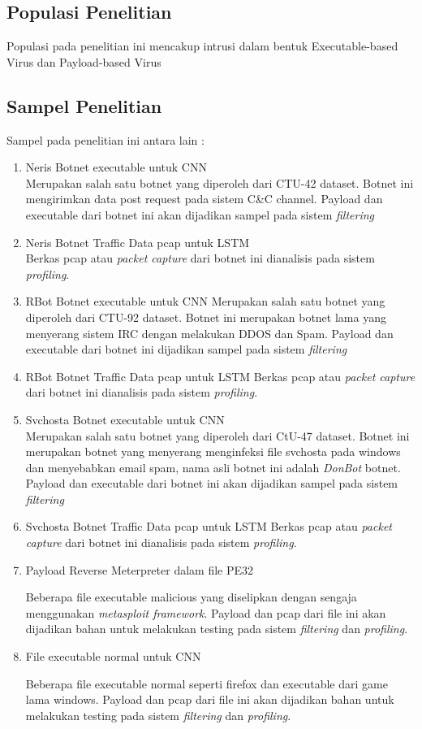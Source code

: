 \documentclass[./skripsi.tex]{subfiles}
\begin{document}
\subsection{Populasi Penelitian}
\par Populasi pada penelitian ini mencakup intrusi dalam bentuk Executable-based Virus dan Payload-based Virus
\subsection{Sampel Penelitian}
\par Sampel pada penelitian ini antara lain :
\begin{enumerate}
    \item Neris Botnet executable untuk CNN\\
    Merupakan salah satu botnet yang diperoleh dari CTU-42 dataset. Botnet ini mengirimkan data post request pada sistem C\&C channel. Payload dan executable dari botnet ini akan dijadikan sampel pada sistem \textit{filtering}
    \item Neris Botnet Traffic Data pcap untuk LSTM\\
    Berkas pcap atau \textit{packet capture} dari botnet ini dianalisis pada sistem \textit{profiling}.
    \item RBot Botnet executable untuk CNN
    Merupakan salah satu botnet yang diperoleh dari CTU-92 dataset. Botnet ini merupakan botnet lama yang menyerang sistem IRC dengan melakukan DDOS dan Spam. Payload dan executable dari botnet ini dijadikan sampel pada sistem \textit{filtering}
    \item RBot Botnet Traffic Data pcap untuk LSTM
    Berkas pcap atau \textit{packet capture} dari botnet ini dianalisis pada sistem \textit{profiling}.
    \item Svchosta Botnet executable untuk CNN\\
    Merupakan salah satu botnet yang diperoleh dari CtU-47 dataset. Botnet ini merupakan botnet yang menyerang menginfeksi file svchosta pada windows dan menyebabkan email spam, nama asli botnet ini adalah \textit{DonBot} botnet. Payload dan executable dari botnet ini akan dijadikan sampel pada sistem \textit{filtering}
    \item Svchosta Botnet Traffic Data pcap untuk LSTM
    Berkas pcap atau \textit{packet capture} dari botnet ini dianalisis pada sistem \textit{profiling}.
    \item Payload Reverse Meterpreter dalam file PE32
    \par Beberapa file executable malicious yang diselipkan dengan sengaja menggunakan \textit{metasploit framework}. Payload dan pcap dari file ini akan dijadikan bahan untuk melakukan testing pada sistem \textit{filtering} dan \textit{profiling}.
    \item File executable normal untuk CNN
    \par Beberapa file executable normal seperti firefox dan executable dari game lama windows. Payload dan pcap dari file ini akan dijadikan bahan untuk melakukan testing pada sistem \textit{filtering} dan \textit{profiling}.
\end{enumerate}
\end{document}
